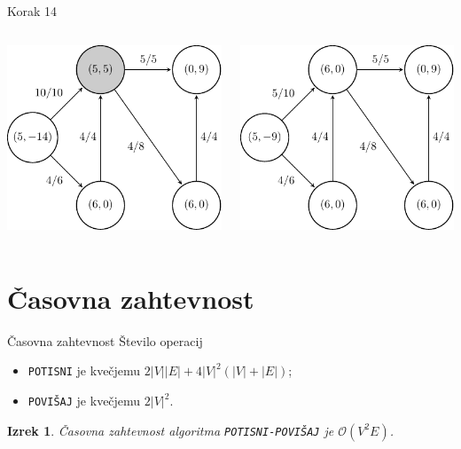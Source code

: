 \documentclass{beamer}
\newtheorem{thm}{Izrek}
\begin{document}
\begin{frame}{Korak 14}
    \begin{columns}
        \begin{column}{0.5\textwidth}
            \centering
            \includegraphics[scale=0.7]{../writing/images/graf2-15.pdf}
        \end{column}
        \pause
        \begin{column}{0.5\textwidth}
            \centering
            \includegraphics[scale=0.7]{../writing/images/graf2-16.pdf}
        \end{column}
    \end{columns}
\end{frame}

\section{Časovna zahtevnost}
\begin{frame}{Časovna zahtevnost}
    Število operacij
    \begin{itemize}
        \item \texttt{POTISNI} je kvečjemu $2|V||E| + 4|V|^2 (|V| + |E|)$;
        \item \texttt{POVIŠAJ} je kvečjemu $2|V|^2$.
    \end{itemize}
    \pause
    \begin{thm}
        Časovna zahtevnost algoritma \texttt{POTISNI-POVIŠAJ} je $\mathcal{O}(V^2E)$.
    \end{thm}
\end{frame}
\end{document}
